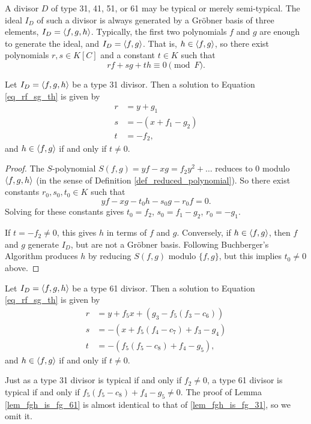 A divisor $D$ of type 31, 41, 51, or 61 may be typical or merely semi-typical.
The ideal $I_D$ of such a divisor is always generated by a Gr\"obner basis of three elements, $I_D = \left\langle f,g,h \right\rangle$.
Typically, the first two polynomials $f$ and $g$ are enough to generate the ideal, and $I_D = \left\langle f,g \right\rangle$.
That is, $h \in \left\langle f,g \right\rangle$, so there exist polynomials $r, s \in K[C]$ and a constant $t \in K$ such that
\begin{equation}
  \label{eq_rf_sg_th}
  rf + sg + th \equiv 0 \pmod F.
\end{equation}
\begin{lemma}
  \label{lem_fgh_is_fg_31}
  Let $I_D = \left\langle f,g,h \right\rangle$ be a type 31 divisor.
  Then a solution to Equation \ref{eq_rf_sg_th} is given by
  \begin{align*}
    r &= y + g_1 \\
    s &= -(x + f_1 - g_2) \\
    t &= -f_2,
  \end{align*}
  and $h \in \left\langle f,g \right\rangle$ if and only if $t \neq 0$.
\end{lemma}
\begin{proof}
  The $S$-polynomial $S(f, g) = yf - xg = f_2y^2 + \ldots$ reduces to 0 modulo $\left\langle f,g,h \right\rangle$
  (in the sense of Definition \ref{def_reduced_polynomial}).
  So there exist constants $r_0, s_0, t_0 \in K$ such that 
  \[ yf - xg - t_0h - s_0g - r_0f = 0. \]
  Solving for these constants gives $t_0 = f_2$, $s_0 = f_1 - g_2$, $r_0 = -g_1$.
  
  If $t = -f_2 \neq 0$, this gives $h$ in terms of $f$ and $g$.
  Conversely, if $h \in \left\langle f,g \right\rangle$, then $f$ and $g$ generate $I_D$, but are not a Gr\"obner basis.
  Following Buchberger's Algorithm produces $h$
  by reducing $S(f,g)$ modulo $\{f,g\}$, but this implies $t_0 \neq 0$ above.
\end{proof}
\begin{lemma}
  \label{lem_fgh_is_fg_61}
  Let $I_D = \left\langle f,g,h \right\rangle$ be a type 61 divisor.
  Then a solution to Equation \ref{eq_rf_sg_th} is given by
  \begin{align*}
    r &= y + f_5x + (g_3 - f_5(f_3 - c_6)) \\
    s &= -(x + f_5(f_4 - c_7) + f_3 - g_4) \\
    t &= -(f_5(f_5 - c_8) + f_4 - g_5),
  \end{align*}
  and $h \in \left\langle f,g \right\rangle$ if and only if $t \neq 0$.
\end{lemma}
Just as a type 31 divisor is typical if and only if $f_2 \neq 0$,
a type 61 divisor is typical if and only if $f_5(f_5 - c_8) + f_4 - g_5 \neq 0$.
The proof of Lemma \ref{lem_fgh_is_fg_61} is almost identical to that of \ref{lem_fgh_is_fg_31}, so we omit it.

